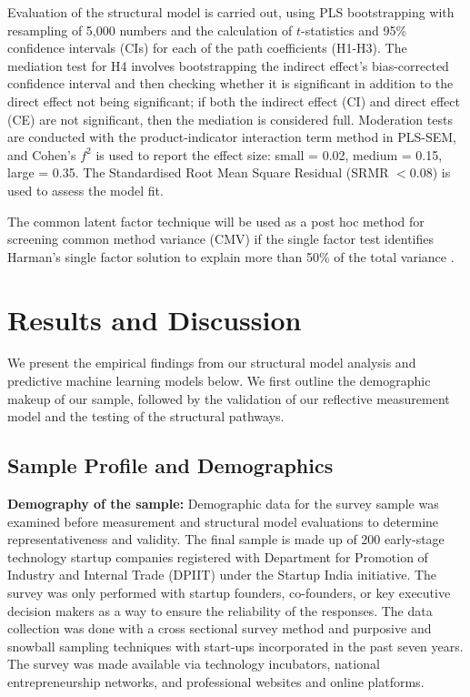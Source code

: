 \documentclass{ieeeaccess}
\begin{document}
Evaluation of the structural model is carried out, using PLS bootstrapping with resampling of 5,000 numbers and the calculation of $t$-statistics and 95\% confidence intervals (CIs) for each of the path coefficients (H1-H3). The mediation test for H4 involves bootstrapping the indirect effect's bias-corrected confidence interval and then checking whether it is significant in addition to the direct effect not being significant; if both the indirect effect (CI) and direct effect (CE) are not significant, then the mediation is considered full. Moderation tests are conducted with the product-indicator interaction term method in PLS-SEM, and Cohen's $f^2$ is used to report the effect size: small = 0.02, medium = 0.15, large = 0.35. The Standardised Root Mean Square Residual (SRMR $< 0.08$) is used to assess the model fit.

The common latent factor technique will be used as a post hoc method for screening common method variance (CMV) if the single factor test identifies Harman's single factor solution to explain more than 50\% of the total variance \cite{b21}.

\section{Results and Discussion}
\label{sec:results}

We present the empirical findings from our structural model analysis and predictive machine learning models below. We first outline the demographic makeup of our sample, followed by the validation of our reflective measurement model and the testing of the structural pathways.

\subsection{Sample Profile and Demographics}

\textbf{Demography of the sample:}
Demographic data for the survey sample was examined before measurement and structural model evaluations to determine representativeness and validity. The final sample is made up of 200 early-stage technology startup companies registered with Department for Promotion of Industry and Internal Trade (DPIIT) under the Startup India initiative. The survey was only performed with startup founders, co-founders, or key executive decision makers as a way to ensure the reliability of the responses. The data collection was done with a cross sectional survey method and purposive and snowball sampling techniques with start-ups incorporated in the past seven years. The survey was made available via technology incubators, national entrepreneurship networks, and professional websites and online platforms.
\end{document}

